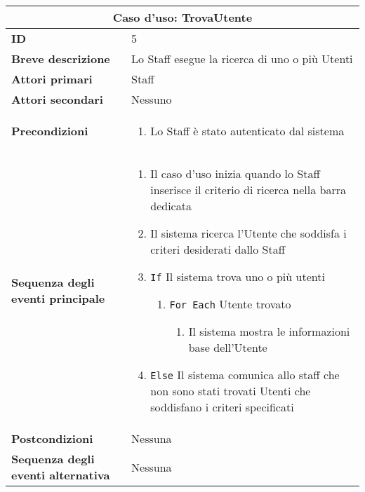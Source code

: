 \documentclass[a4paper]{report}
\begin{document}
\clearpage
\begin{table}[H]
\vspace*{-0cm}
\renewcommand{\arraystretch}{1.9}
\begin{tabular}{|p{3.9cm}|p{9.9cm}|}
\hline
\multicolumn{2}{|c|}{\textbf{Caso d’uso: TrovaUtente}} \\ \hline
\textbf{ID} & 5 \\ \hline
\textbf{Breve descrizione} & Lo Staff esegue la ricerca di uno o più Utenti \\ \hline
\textbf{Attori primari} & Staff \\ \hline
\textbf{Attori secondari} & Nessuno \\ \hline
\textbf{Precondizioni} & \begin{enumerate}[leftmargin=14pt,label=\arabic*.,labelsep=0.5em,topsep=0pt,partopsep=0pt,parsep=0pt,itemsep=0pt]
    \item Lo Staff è stato autenticato dal sistema
\end{enumerate} \\ \hline
\textbf{Sequenza degli eventi principale} &
\begin{enumerate}[leftmargin=14pt,label=\arabic*.,labelsep=0.5em,topsep=0pt,partopsep=0pt,parsep=0pt,itemsep=0pt]
    \item Il caso d’uso inizia quando lo Staff inserisce il criterio di ricerca nella barra dedicata 
    \item Il sistema ricerca l’Utente che soddisfa i criteri desiderati dallo Staff
    \item \texttt{If} Il sistema trova uno o più utenti
    \begin{enumerate}[label=\arabic{enumi}.\arabic{enumii}.,leftmargin=22pt,labelsep=0.5em,topsep=0pt,partopsep=0pt,parsep=0pt,itemsep=0pt]
    \item \texttt{For Each} Utente trovato
    \begin{enumerate}[label=\arabic{enumi}.\arabic{enumii}.\arabic{enumiii}.,leftmargin=22pt,labelsep=0.5em,topsep=0pt,partopsep=0pt,parsep=0pt,itemsep=0pt]
        \item Il sistema mostra le informazioni base dell’Utente
    \end{enumerate}
    \end{enumerate}
    \item \texttt{Else} Il sistema comunica allo staff che non sono stati trovati Utenti che soddisfano i criteri specificati
\end{enumerate}\\ \hline
\textbf{Postcondizioni} & Nessuna \\ \hline
\textbf{Sequenza degli eventi alternativa} & Nessuna \\ \hline
\end{tabular}
\end{table}
\end{document}
